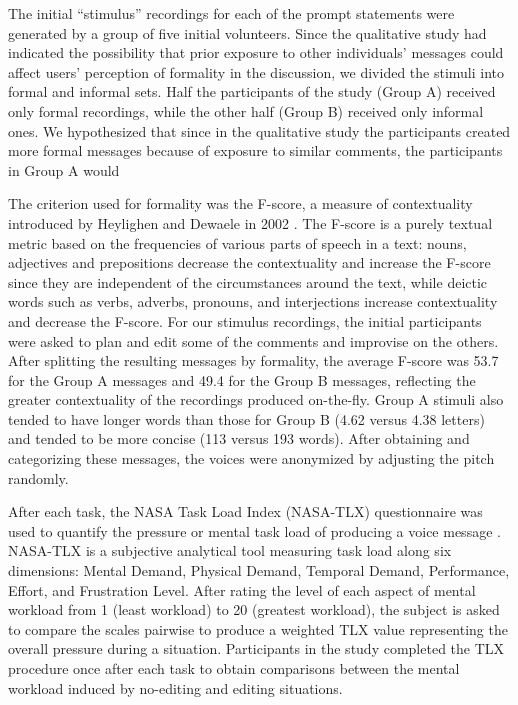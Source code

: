 The initial ``stimulus'' recordings for each of the prompt statements were generated by a group of five initial volunteers. 
Since the qualitative study had indicated the possibility that prior exposure to other individuals' messages could affect users' perception of formality in the discussion, we divided the stimuli into formal and informal sets. 
Half the participants of the study (Group A) received only formal recordings, while the other half (Group B) received only informal ones.
We hypothesized that since in the qualitative study the participants created more formal messages because of exposure to similar comments, the participants in Group A would 

The criterion used for formality was the F-score, a measure of contextuality introduced by Heylighen and Dewaele in 2002 \cite{heylighen}.
The F-score is a purely textual metric based on the frequencies of various parts of speech in a text: nouns, adjectives and prepositions decrease the contextuality and increase the F-score since they are independent of the circumstances around the text, while deictic words such as verbs, adverbs, pronouns, and interjections increase contextuality and decrease the F-score. 
For our stimulus recordings, the initial participants were asked to plan and edit some of the comments and improvise on the others.
After splitting the resulting messages by formality, the average F-score was 53.7 for the Group A messages and 49.4 for the Group B messages, reflecting the greater contextuality of the recordings produced on-the-fly.
Group A stimuli also tended to have longer words than those for Group B (4.62 versus 4.38 letters) and tended to be more concise (113 versus 193 words).
After obtaining and categorizing these messages, the voices were anonymized by adjusting the pitch randomly.

After each task, the NASA Task Load Index (NASA-TLX) questionnaire was used to quantify the pressure or mental task load of producing a voice message \cite{nasatlx}. 
NASA-TLX is a subjective analytical tool measuring task load along six dimensions: Mental Demand, Physical Demand, Temporal Demand, Performance, Effort, and Frustration Level. 
After rating the level of each aspect of mental workload from 1 (least workload) to 20 (greatest workload), the subject is asked to compare the scales pairwise to produce a weighted TLX value representing the overall pressure during a situation. 
Participants in the study completed the TLX procedure once after each task to obtain comparisons between the mental workload induced by no-editing and editing situations.

